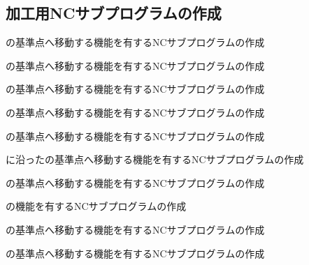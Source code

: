 \subsection{加工用NCサブプログラムの作成}
\begin{enumerate}[label={\sarrow[red]}]
\item \EndFacecutMilling の基準点へ移動する機能を有するNCサブプログラムの作成
\item \OutcutMilling の基準点へ移動する機能を有するNCサブプログラムの作成
\item[\sarrow] \CurvedOutcutMilling の基準点へ移動する機能を有するNCサブプログラムの作成
\item \KeywayMilling の基準点へ移動する機能を有するNCサブプログラムの作成
\item \EndFaceOutCChamferMilling の基準点へ移動する機能を有するNCサブプログラムの作成
\item[\sarrow] \CurvedOutcut に沿った\EndFaceOutCChamferMilling の基準点へ移動する機能を有するNCサブプログラムの作成
\item \EndFaceInCChamferMilling の基準点へ移動する機能を有するNCサブプログラムの作成
\item \DimpleMilling の機能を有するNCサブプログラムの作成
\item[\sarrow] \EndFaceBoringMilling の基準点へ移動する機能を有するNCサブプログラムの作成
\item[\sarrow] \IncutBoringMilling の基準点へ移動する機能を有するNCサブプログラムの作成
\end{enumerate}


